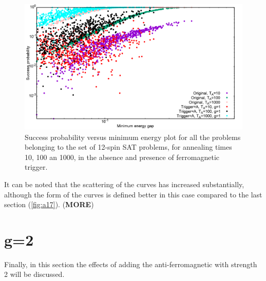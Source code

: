 \documentclass[../main.tex]{subfiles}
\begin{document}
\begin{figure}[H]
\centering 
\includegraphics[scale=0.3]{SuccVsGap_OA_g1.png}
\caption{Success probability versus minimum energy plot for all the problems belonging to the set of 12-spin SAT problems, for annealing times 10, 100 an 1000, in the absence and presence of ferromagnetic trigger.}
\label{fig:a30}
\end{figure}
It can be noted that the scattering of the curves has increased substantially, although the form of the curves is defined better in this case compared to the last section (\ref{fig:a17}). (\textbf{MORE})


\section*{g=2}
Finally, in this section the effects of adding the anti-ferromagnetic with strength 2 will be discussed. 
\end{document}
